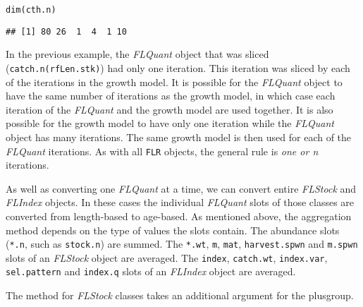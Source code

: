 \documentclass[a4paper,english,10pt]{article}\usepackage[]{graphicx}\usepackage[]{color}
\makeatletter
\newcommand{\hlstd}[1]{\textcolor[rgb]{0,0,0}{#1}}%
\newcommand{\hlkwd}[1]{\textcolor[rgb]{0.361,0.506,0.596}{#1}}%
\newenvironment{kframe}{%
 \def\at@end@of@kframe{}%
 \ifinner\ifhmode%
  \def\at@end@of@kframe{\end{minipage}}%
  \begin{minipage}{\columnwidth}%
 \fi\fi%
 \def\FrameCommand##1{\hskip\@totalleftmargin \hskip-\fboxsep
 \colorbox{shadecolor}{##1}\hskip-\fboxsep
     \hskip-\linewidth \hskip-\@totalleftmargin \hskip\columnwidth}%
 \MakeFramed {\advance\hsize-\width
   \@totalleftmargin\z@ \linewidth\hsize
   \@setminipage}}%
 {\par\unskip\endMakeFramed%
 \at@end@of@kframe}
\newenvironment{knitrout}{}{} %
\newcommand{\code}[1]{{\texttt{#1}}}
\newcommand{\pkg}[1]{{\texttt{#1}}}
\newcommand{\class}[1]{{\textit{#1}}}
\makeatother
\begin{document}
\begin{knitrout}
\color{fgcolor}\begin{kframe}
\begin{alltt}
\hlkwd{dim}\hlstd{(cth.n)}
\end{alltt}
\begin{verbatim}
## [1] 80 26  1  4  1 10
\end{verbatim}
\end{kframe}
\end{knitrout}

In the previous example, the \class{FLQuant} object that was sliced (\code{catch.n(rfLen.stk)}) had only one iteration. This iteration was sliced by each of the iterations in the growth model. It is possible for the \class{FLQuant} object to have the same number of iterations as the growth model, in which case each iteration of the \class{FLQuant} and the growth model are used together. It is also possible for the growth model to have only one iteration while the \class{FLQuant} object has many iterations. The same growth model is then used for each of the \class{FLQuant} iterations. As with all \pkg{FLR} objects, the general rule is \emph{one or n} iterations.


As well as converting one \class{FLQuant} at a time, we can convert entire \class{FLStock} and \class{FLIndex} objects. In these cases the individual \class{FLQuant} slots of those classes are converted from length-based to age-based. As mentioned above, the aggregation method depends on the type of values the slots contain. The abundance slots (\code{*.n}, such as \code{stock.n}) are summed. The \code{*.wt}, \code{m}, \code{mat}, \code{harvest.spwn} and \code{m.spwn} slots of an \class{FLStock} object are averaged. The \code{index}, \code{catch.wt}, \code{index.var}, \code{sel.pattern} and \code{index.q} slots of an \class{FLIndex} object are averaged.

The method for \class{FLStock} classes takes an additional argument for the plusgroup.
\end{document}
